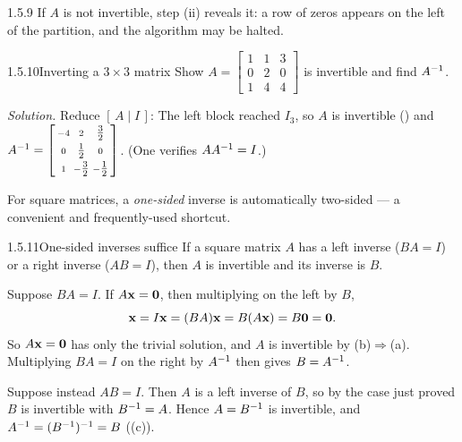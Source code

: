 \begin{rmks}{1.5.9}
If $A$ is not invertible, step (ii) reveals it: a row of zeros appears on the left of the partition, and the algorithm may be halted.
\end{rmks}

\begin{exmp}{1.5.10}{Inverting a $3\times3$ matrix}
Show $A=\left[\begin{smallmatrix}1&1&3\\0&2&0\\1&4&4\end{smallmatrix}\right]$ is invertible and find $A^{-1}$.

\smallskip
\noindent\textit{Solution.} Reduce $[\,A\mid I\,]$:
The left block reached $I_3$, so $A$ is invertible () and
$A^{-1}=\left[\begin{smallmatrix}-4&2&\tfrac32\\[1pt]0&\tfrac12&0\\[1pt]1&-\tfrac32&-\tfrac12\end{smallmatrix}\right]$.
(One verifies $AA^{-1}=I$.)
\end{exmp}

For square matrices, a \emph{one-sided} inverse is automatically two-sided --- a convenient and frequently-used shortcut.

\begin{thms}{1.5.11}{One-sided inverses suffice}
If a square matrix $A$ has a left inverse ($BA=I$) or a right inverse ($AB=I$), then $A$ is invertible and its inverse is $B$.
\end{thms}

\begin{prf}
 Suppose $BA=I$. If $A\mathbf{x}=\mathbf{0}$, then multiplying on the left by $B$,
\[
\mathbf{x}=I\mathbf{x}=(BA)\mathbf{x}=B(A\mathbf{x})=B\mathbf{0}=\mathbf{0}.
\]
So $A\mathbf{x}=\mathbf{0}$ has only the trivial solution, and $A$ is invertible by  (b)$\Rightarrow$(a). Multiplying $BA=I$ on the right by $A^{-1}$ then gives $B=A^{-1}$.

 Suppose instead $AB=I$. Then $A$ is a left inverse of $B$, so by the case just proved $B$ is invertible with $B^{-1}=A$. Hence $A=B^{-1}$ is invertible, and $A^{-1}=(B^{-1})^{-1}=B$ ((c)).
\end{prf}

